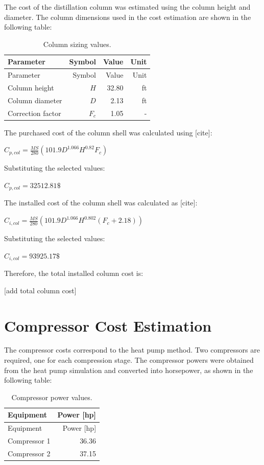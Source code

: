 The cost of the distillation column was estimated using the column
height and diameter. The column dimensions used in the cost estimation
are shown in the following table:

\begin{longtable}[]{@{}lrrr@{}}
\caption{Column sizing values.
\label{tab:Column sizing values.}}\tabularnewline
\toprule\noalign{}
Parameter & Symbol & Value & Unit \\
\midrule\noalign{}
\endfirsthead
\toprule\noalign{}
Parameter & Symbol & Value & Unit \\
\midrule\noalign{}
\endhead
\bottomrule\noalign{}
\endlastfoot
Column height & \(H\) & 32.80 & ft \\
Column diameter & \(D\) & 2.13 & ft \\
Correction factor & \(F_c\) & 1.05 & - \\
\end{longtable}

The purchased cost of the column shell was calculated using {[}cite{]}:

\(C_{p,col} = \frac{MS}{280} \left(101.9 D^{1.066} H^{0.82} F_c \right)\)

Substituting the selected values:

\(C_{p,col} = 32512.81 \text{\$}\)

The installed cost of the column shell was calculated as {[}cite{]}:

\(C_{i,col} = \frac{MS}{280} \left(101.9 D^{1.066} H^{0.802}(F_c + 2.18)\right)\)

Substituting the selected values:

\(C_{i,col} = 93925.17 \text{\$}\)

Therefore, the total installed column cost is:

{[}add total column cost{]}

\section{Compressor Cost Estimation}\label{compressor-cost-estimation}

The compressor costs correspond to the heat pump method. Two compressors
are required, one for each compression stage. The compressor powers were
obtained from the heat pump simulation and converted into horsepower, as
shown in the following table:

\begin{longtable}[]{@{}lr@{}}
\caption{Compressor power values.
\label{tab:Compressor power values.}}\tabularnewline
\toprule\noalign{}
Equipment & Power {[}hp{]} \\
\midrule\noalign{}
\endfirsthead
\toprule\noalign{}
Equipment & Power {[}hp{]} \\
\midrule\noalign{}
\endhead
\bottomrule\noalign{}
\endlastfoot
Compressor 1 & 36.36 \\
Compressor 2 & 37.15 \\
\end{longtable}

